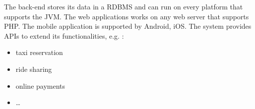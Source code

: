 The back-end stores its data in a RDBMS and  can run on every platform that supports the JVM.
The web applications works on any web server that supports PHP. The mobile application is supported by Android, iOS. The system provides APIs to extend its functionalities, e.g. :
\begin{itemize}
\item taxi reservation
\item ride sharing
\item online payments
\item \ldots
\end{itemize}






